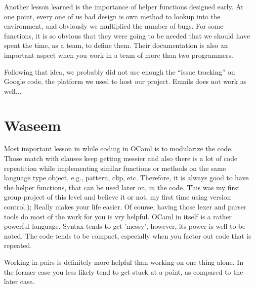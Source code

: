 Another lesson learned is the importance of helper functions designed early.
At one point, every one of us had design is own method to lookup into the
environment, and obviously we multiplied the number of bugs. For some
functions, it is so obvious that they were going to be needed that we should
have spent the time, as a team, to define them. Their documentation is
also an important aspect when you work in a team of more than two programmers.

Following that idea, we probably did not use enough the ``issue tracking''
on Google code, the platform we used to host our project. Emails does not
work as well...

\section{Waseem}

Most important lesson in while coding in OCaml is to modularize the code.
Those match with clauses keep getting messier and also there is a lot of code 
repeatition while implementing similar functions or methods on the same language 
type object, e.g., pattern, clip, etc. Therefore, it is always good to have the 
helper functions, that can be used later on, in the code. This was my first group
project of this level and believe it or not, my first time using version control:); 
Really makes your life easier. Of course, having those lexer and parser tools do 
most of the work for you is vry helpful. OCaml in itself is a rather powerful language. 
Syntax tends to get 'messy', however, its power is well to be noted. The code tends 
to be compact, especially when you factor out code that is repeated.

Working in pairs is definitely more helpful than working on one thing alone. In the former
case you less likely tend to get stuck at a point, as compared to the later case. 

